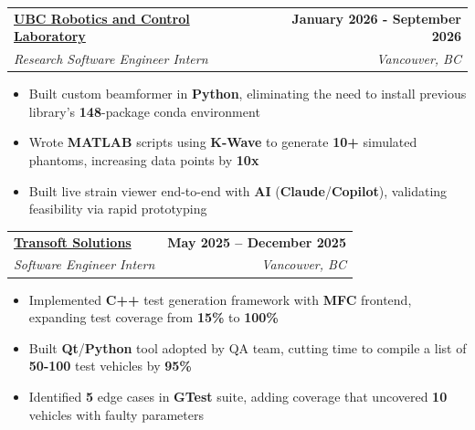\documentclass[letterpaper,11pt]{article}
\makeatletter
\newcommand{\resumeItem}[1]{
  \item\small{
    {#1 \vspace{-2pt}}
  }
}
\newcommand{\resumeSubheading}[4]{
  \vspace{-2pt}\item
    \begin{tabular*}{1.0\textwidth}[t]{l@{\extracolsep{\fill}}r}
      \textbf{#1} & \textbf{\small #2} \\
      \textit{\small#3} & \textit{\small #4} \\
    \end{tabular*}\vspace{-7pt}
}
\newcommand{\resumeItemListStart}{\begin{itemize}}
\newcommand{\resumeItemListEnd}{\end{itemize}\vspace{-5pt}}
\makeatother
\begin{document}
    \resumeSubheading
      {\href{https://rcl.ece.ubc.ca/home-page/}{UBC Robotics and Control Laboratory}}{January 2026 - September 2026}
      {Research Software Engineer Intern}{Vancouver, BC}
      \resumeItemListStart
        \resumeItem{Built custom beamformer in \textbf{Python}, eliminating the need to install previous library's \textbf{148}-package conda environment}
        \resumeItem{Wrote \textbf{MATLAB} scripts using \textbf{K-Wave} to generate \textbf{10+} simulated phantoms, increasing data points by \textbf{10x}}
        \resumeItem{Built live strain viewer end-to-end with \textbf{AI} (\textbf{Claude}/\textbf{Copilot}), validating feasibility via rapid prototyping}
      \resumeItemListEnd
      

    \resumeSubheading
      {\href{https://www.transoftsolutions.com/}{Transoft Solutions \textnormal{}}}{May 2025 -- December 2025}
      {Software Engineer Intern
      }{Vancouver, BC}
      \resumeItemListStart
        \resumeItem{Implemented \textbf{C++} test generation framework with \textbf{MFC} frontend, expanding test coverage from \textbf{15\%} to \textbf{100\%}}
        \resumeItem{Built \textbf{Qt}/\textbf{Python} tool adopted by QA team, cutting time to compile a list of \textbf{50-100} test vehicles by \textbf{95\%}}
        \resumeItem{Identified \textbf{5} edge cases in \textbf{GTest} suite, adding coverage that uncovered \textbf{10} vehicles with faulty parameters}
      \resumeItemListEnd
\end{document}
